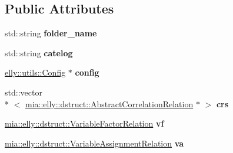 \subsection*{Public Attributes}
\begin{DoxyCompactItemize}
\item 
\hypertarget{classmia_1_1elly_1_1utils_1_1_factor_file_parser_a39e0a9d37ac7f53d3dec871b89cdd0b7}{std\-::string {\bfseries folder\-\_\-name}}\label{classmia_1_1elly_1_1utils_1_1_factor_file_parser_a39e0a9d37ac7f53d3dec871b89cdd0b7}

\item 
\hypertarget{classmia_1_1elly_1_1utils_1_1_factor_file_parser_a5dc9d676ae311be40f4092a083618919}{std\-::string {\bfseries catelog}}\label{classmia_1_1elly_1_1utils_1_1_factor_file_parser_a5dc9d676ae311be40f4092a083618919}

\item 
\hypertarget{classmia_1_1elly_1_1utils_1_1_factor_file_parser_a69922c1caf4cd9cc461f92e6e3df5e31}{\hyperlink{classmia_1_1elly_1_1utils_1_1_config}{elly\-::utils\-::\-Config} $\ast$ {\bfseries config}}\label{classmia_1_1elly_1_1utils_1_1_factor_file_parser_a69922c1caf4cd9cc461f92e6e3df5e31}

\item 
\hypertarget{classmia_1_1elly_1_1utils_1_1_factor_file_parser_acecc638c25c78ef6b94b34347439b37c}{std\-::vector\\*
$<$ \hyperlink{classmia_1_1elly_1_1dstruct_1_1_abstract_correlation_relation}{mia\-::elly\-::dstruct\-::\-Abstract\-Correlation\-Relation} $\ast$ $>$ {\bfseries crs}}\label{classmia_1_1elly_1_1utils_1_1_factor_file_parser_acecc638c25c78ef6b94b34347439b37c}

\item 
\hypertarget{classmia_1_1elly_1_1utils_1_1_factor_file_parser_ac40c1abf8d8de047aa89d83c2fb2bf9d}{\hyperlink{classmia_1_1elly_1_1dstruct_1_1_variable_factor_relation}{mia\-::elly\-::dstruct\-::\-Variable\-Factor\-Relation} {\bfseries vf}}\label{classmia_1_1elly_1_1utils_1_1_factor_file_parser_ac40c1abf8d8de047aa89d83c2fb2bf9d}

\item 
\hypertarget{classmia_1_1elly_1_1utils_1_1_factor_file_parser_ae92501856f9edeffd318af50c778c72b}{\hyperlink{classmia_1_1elly_1_1dstruct_1_1_variable_assignment_relation}{mia\-::elly\-::dstruct\-::\-Variable\-Assignment\-Relation} {\bfseries va}}\label{classmia_1_1elly_1_1utils_1_1_factor_file_parser_ae92501856f9edeffd318af50c778c72b}


\end{DoxyCompactItemize}
